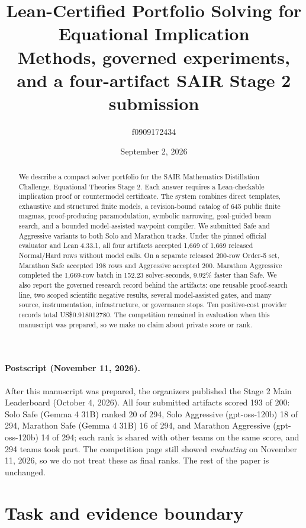 \documentclass[10pt]{article}
\title{Lean-Certified Portfolio Solving for Equational Implication\\\large Methods, governed experiments, and a four-artifact SAIR Stage 2 submission}
\author{f0909172434}
\date{September 2, 2026}
\begin{document}
\maketitle

\begin{abstract}
We describe a compact solver portfolio for the SAIR Mathematics Distillation Challenge, Equational Theories Stage 2. Each answer requires a Lean-checkable implication proof or countermodel certificate. The system combines direct templates, exhaustive and structured finite models, a revision-bound catalog of 645 public finite magmas, proof-producing paramodulation, symbolic narrowing, goal-guided beam search, and a bounded model-assisted waypoint compiler. We submitted Safe and Aggressive variants to both Solo and Marathon tracks. Under the pinned official evaluator and Lean 4.33.1, all four artifacts accepted 1,669 of 1,669 released Normal/Hard rows without model calls. On a separate released 200-row Order-5 set, Marathon Safe accepted 198 rows and Aggressive accepted 200. Marathon Aggressive completed the 1,669-row batch in 152.23 solver-seconds, 9.92\% faster than Safe. We also report the governed research record behind the artifacts: one reusable proof-search line, two scoped scientific negative results, several model-assisted gates, and many source, instrumentation, infrastructure, or governance stops. Ten positive-cost provider records total US\$0.918012780. The competition remained in evaluation when this manuscript was prepared, so we make no claim about private score or rank.
\end{abstract}

\paragraph{Postscript (November 11, 2026).} After this manuscript was prepared, the organizers published the Stage 2 Main Leaderboard (October 4, 2026). All four submitted artifacts scored 193 of 200: Solo Safe (Gemma 4 31B) ranked 20 of 294, Solo Aggressive (gpt-oss-120b) 18 of 294, Marathon Safe (Gemma 4 31B) 16 of 294, and Marathon Aggressive (gpt-oss-120b) 14 of 294; each rank is shared with other teams on the same score, and 294 teams took part. The competition page still showed \emph{evaluating} on November 11, 2026, so we do not treat these as final ranks. The rest of the paper is unchanged.

\section{Task and evidence boundary}
\end{document}
